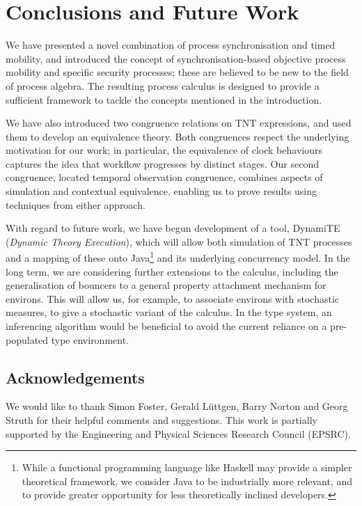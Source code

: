 \documentclass[orivec,envcountsame]{llncs}
\begin{document}
\section{Conclusions and Future Work}
\label{futurework}

We have presented a novel combination of process synchronisation and
timed mobility, and introduced the concept of synchronisation-based
objective process mobility and specific security processes; these are
believed to be new to the field of process algebra.  The resulting
process calculus is designed to provide a sufficient framework to tackle
the concepts mentioned in the introduction.

We have also introduced two congruence relations on TNT expressions, and
used them to develop an equivalence theory. Both congruences
respect the underlying motivation for our work; in particular, the
equivalence of clock behaviours captures the idea that workflow
progresses by distinct stages. Our second congruence, located temporal
observation congruence, combines aspects of simulation and contextual
equivalence, enabling us to prove results using techniques from either
approach.

With regard to future work, we have begun development of a tool,
DynamiTE (\emph{Dynamic Theory Execution}), which will allow both
simulation of TNT processes and a mapping of these onto
Java\footnote{While a functional programming language like Haskell may
provide a simpler theoretical framework, we consider Java to be
industrially more relevant, and to provide greater opportunity for less
theoretically inclined developers.} and its underlying concurrency
model.  In the long term, we are considering further extensions to the
calculus, including the generalisation of bouncers to a general property
attachment mechanism for environs.  This will allow us, for example, to
associate environs with stochastic measures, to give a stochastic
variant of the calculus.  In the type system, an inferencing algorithm
would be beneficial to avoid the current reliance on a pre-populated
type environment.

\subsection*{Acknowledgements}

We would like to thank Simon Foster, Gerald L{\"u}ttgen, Barry Norton
and Georg Struth for their helpful comments and suggestions.  This work
is partially supported by the Engineering and Physical Sciences Research
Council ({EPSRC}).



\end{document}
